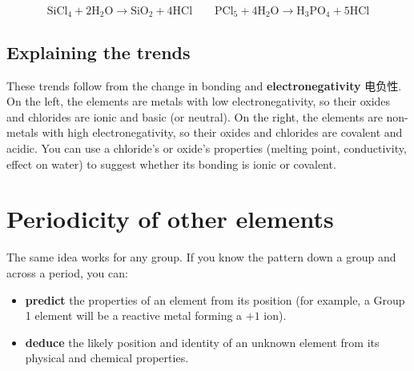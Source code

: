 \documentclass[11pt]{article}
\begin{document}
\[
\text{SiCl}_4 + 2\text{H}_2\text{O} \rightarrow \text{SiO}_2 + 4\text{HCl} \qquad \text{PCl}_5 + 4\text{H}_2\text{O} \rightarrow \text{H}_3\text{PO}_4 + 5\text{HCl}
\]

\subsection*{Explaining the trends}

These trends follow from the change in bonding and \textbf{electronegativity} 电负性. On the left, the elements are metals with low electronegativity, so their oxides and chlorides are ionic and basic (or neutral). On the right, the elements are non-metals with high electronegativity, so their oxides and chlorides are covalent and acidic. You can use a chloride's or oxide's properties (melting point, conductivity, effect on water) to suggest whether its bonding is ionic or covalent.

\section*{Periodicity of other elements}

The same idea works for any group. If you know the pattern down a group and across a period, you can:

\begin{itemize}
\item \textbf{predict} the properties of an element from its position (for example, a Group 1 element will be a reactive metal forming a $+1$ ion).

\item \textbf{deduce} the likely position and identity of an unknown element from its physical and chemical properties.

\end{itemize}
\end{document}
